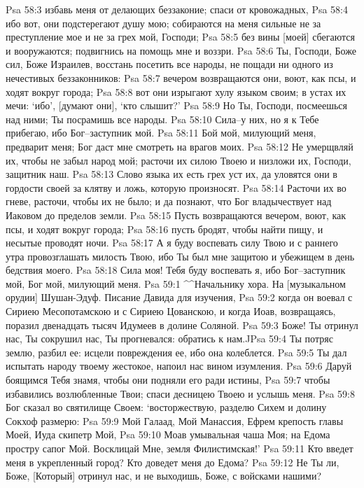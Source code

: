 Psa 58:3  избавь меня от делающих беззаконие; спаси от кровожадных,
Psa 58:4  ибо вот, они подстерегают душу мою; собираются на меня сильные не за преступление мое и не за грех мой, Господи;
Psa 58:5  без вины [моей] сбегаются и вооружаются; подвигнись на помощь мне и воззри.
Psa 58:6  Ты, Господи, Боже сил, Боже Израилев, восстань посетить все народы, не пощади ни одного из нечестивых беззаконников:
Psa 58:7  вечером возвращаются они, воют, как псы, и ходят вокруг города;
Psa 58:8  вот они изрыгают хулу языком своим; в устах их мечи: `ибо', [думают они], `кто слышит?'
Psa 58:9  Но Ты, Господи, посмеешься над ними; Ты посрамишь все народы.
Psa 58:10  Сила--у них, но я к Тебе прибегаю, ибо Бог--заступник мой.
Psa 58:11  Бой мой, милующий меня, предварит меня; Бог даст мне смотреть на врагов моих.
Psa 58:12  Не умерщвляй их, чтобы не забыл народ мой; расточи их силою Твоею и низложи их, Господи, защитник наш.
Psa 58:13  Слово языка их есть грех уст их, да уловятся они в гордости своей за клятву и ложь, которую произносят.
Psa 58:14  Расточи их во гневе, расточи, чтобы их не было; и да познают, что Бог владычествует над Иаковом до пределов земли.
Psa 58:15  Пусть возвращаются вечером, воют, как псы, и ходят вокруг города;
Psa 58:16  пусть бродят, чтобы найти пищу, и несытые проводят ночи.
Psa 58:17  А я буду воспевать силу Твою и с раннего утра провозглашать милость Твою, ибо Ты был мне защитою и убежищем в день бедствия моего.
Psa 58:18  Сила моя! Тебя буду воспевать я, ибо Бог--заступник мой, Бог мой, милующий меня.
Psa 59:1  ^^Начальнику хора. На [музыкальном орудии] Шушан-Эдуф. Писание Давида для изучения,
Psa 59:2  когда он воевал с Сириею Месопотамскою и с Сириею Цованскою, и когда Иоав, возвращаясь, поразил двенадцать тысяч Идумеев в долине Соляной.
Psa 59:3  Боже! Ты отринул нас, Ты сокрушил нас, Ты прогневался: обратись к нам.^^
Psa 59:4  Ты потряс землю, разбил ее: исцели повреждения ее, ибо она колеблется.
Psa 59:5  Ты дал испытать народу твоему жестокое, напоил нас вином изумления.
Psa 59:6  Даруй боящимся Тебя знамя, чтобы они подняли его ради истины,
Psa 59:7  чтобы избавились возлюбленные Твои; спаси десницею Твоею и услышь меня.
Psa 59:8  Бог сказал во святилище Своем: `восторжествую, разделю Сихем и долину Сокхоф размерю:
Psa 59:9  Мой Галаад, Мой Манассия, Ефрем крепость главы Моей, Иуда скипетр Мой,
Psa 59:10  Моав умывальная чаша Моя; на Едома простру сапог Мой. Восклицай Мне, земля Филистимская!'
Psa 59:11  Кто введет меня в укрепленный город? Кто доведет меня до Едома?
Psa 59:12  Не Ты ли, Боже, [Который] отринул нас, и не выходишь, Боже, с войсками нашими?
